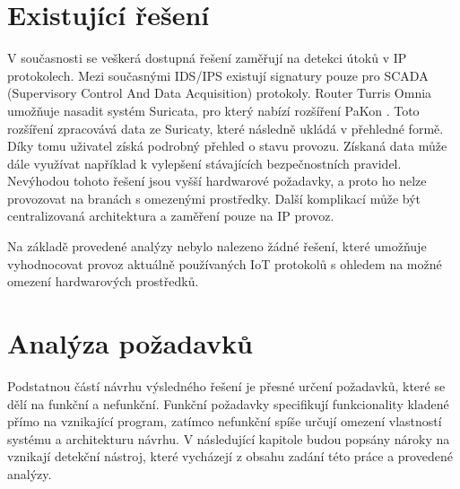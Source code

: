  \section{Existující řešení}
 V současnosti se veškerá dostupná řešení zaměřují na detekci útoků v IP protokolech. Mezi 
 současnými IDS/IPS existují signatury pouze pro SCADA (Supervisory Control And Data Acquisition)
 protokoly. Router Turris Omnia umožňuje nasadit systém Suricata, pro který nabízí rozšíření 
 PaKon \cite{pakon}. Toto rozšíření zpracovává data ze Suricaty, které následně ukládá v přehledné formě.
 Díky tomu uživatel získá podrobný přehled o stavu provozu. Získaná data může dále využívat 
 například k vylepšení stávajících bezpečnostních pravidel. Nevýhodou tohoto řešení jsou 
 vyšší hardwarové požadavky, a proto ho nelze provozovat na branách s omezenými 
 prostředky. Další komplikací může být centralizovaná architektura a zaměření pouze na 
 IP provoz.
 
 Na základě provedené analýzy nebylo nalezeno žádné řešení, které umožňuje vyhodnocovat 
 provoz aktuálně používaných IoT protokolů s ohledem na možné omezení hardwarových
 prostředků.
 
 \newpage
 \section{Analýza požadavků}
 Podstatnou částí návrhu výsledného řešení je přesné určení požadavků, které se dělí na 
 funkční a nefunkční. Funkční požadavky specifikují funkcionality kladené přímo na vznikající
 program, zatímco nefunkční spíše určují omezení vlastností systému a architekturu návrhu. V 
 následující kapitole budou popsány nároky na vznikají detekční nástroj, které vycházejí z obsahu
 zadání této práce a provedené analýzy.
 
